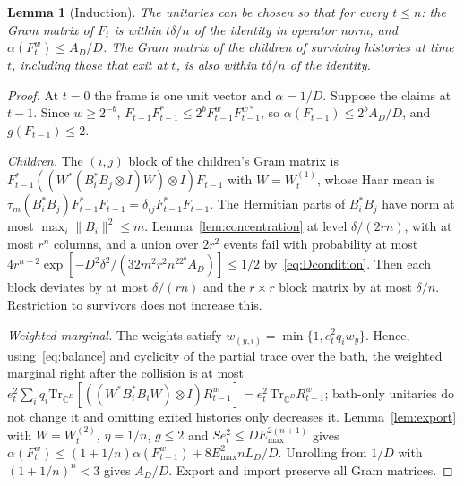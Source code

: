 \documentclass[11pt,a4paper]{article}
\theoremstyle{plain}
\newtheorem{lemma}[theorem]{Lemma}
\theoremstyle{definition}
\theoremstyle{remark}
\begin{document}
\begin{lemma}[Induction]\label{lem:induction}
The unitaries can be chosen so that for every $t\le n$: the Gram matrix of $F_t$ is within $t\delta/n$ of the identity in
operator norm, and $\alpha(F^w_t)\le A_D/D$. The Gram matrix of the children of surviving histories at time $t$,
including those that exit at $t$, is also within $t\delta/n$ of the identity.
\end{lemma}

\begin{proof}
At $t=0$ the frame is one unit vector and $\alpha=1/D$. Suppose the claims at $t-1$. Since $w\ge2^{-b}$,
$F_{t-1}F_{t-1}^*\le2^bF^w_{t-1}F^{w*}_{t-1}$, so $\alpha(F_{t-1})\le2^bA_D/D$, and $g(F_{t-1})\le2$.

\emph{Children.} The $(i,j)$ block of the children's Gram matrix is $F_{t-1}^*((W^*(B_i^*B_j\otimes I)W)\otimes I)F_{t-1}$ with
$W=W^{(1)}_t$, whose Haar mean is $\tau_m(B_i^*B_j)F_{t-1}^*F_{t-1}=\delta_{ij}F_{t-1}^*F_{t-1}$. The Hermitian parts of
$B_i^*B_j$ have norm at most $\max_i\|B_i\|^2\le m$. Lemma~\ref{lem:concentration} at level $\delta/(2rn)$, with at most
$r^n$ columns, and a union over $2r^2$ events fail with probability at most
$4r^{n+2}\exp[-D^2\delta^2/(32m^2r^2n^22^bA_D)]\le1/2$ by~\eqref{eq:Dcondition}. Then each block deviates by at most
$\delta/(rn)$ and the $r\times r$ block matrix by at most $\delta/n$. Restriction to survivors does not increase this.

\emph{Weighted marginal.} The weights satisfy $w_{(y,i)}=\min\{1,e_t^2q_iw_y\}$. Hence, using~\eqref{eq:balance} and
cyclicity of the partial trace over the bath, the weighted marginal right after the collision is at most
$e_t^2\sum_iq_i\mathrm{Tr}_{\mathbb{C}^D}[((W^*B_i^*B_iW)\otimes I)R^w_{t-1}]=e_t^2\,\mathrm{Tr}_{\mathbb{C}^D}R^w_{t-1}$; bath-only unitaries do not change
it and omitting exited histories only decreases it. Lemma~\ref{lem:export} with $W=W^{(2)}_t$, $\eta=1/n$, $g\le2$ and
$Se_t^2\le DE_{\max}^{2(n+1)}$ gives $\alpha(F^w_t)\le(1+1/n)\alpha(F^w_{t-1})+8E_{\max}^2nL_D/D$. Unrolling from $1/D$ with
$(1+1/n)^n<3$ gives $A_D/D$. Export and import preserve all Gram matrices.
\end{proof}
\end{document}
